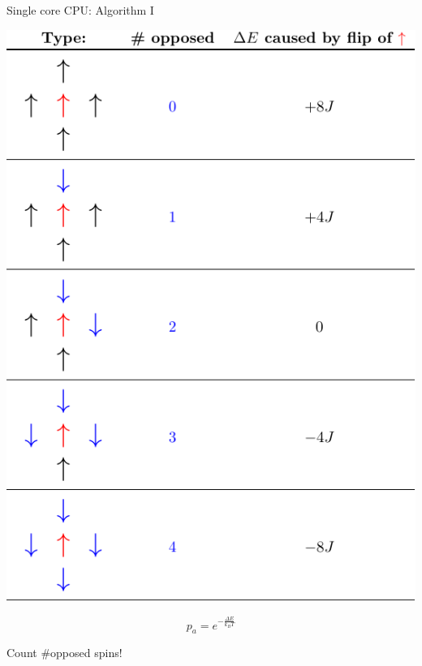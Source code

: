 \documentclass{beamer}
\begin{document}
\begin{frame}{Single core CPU: Algorithm I}
    \begin{minipage}{0.5\textwidth}
        \includegraphics[keepaspectratio=true, scale=0.6]{images/cases.pdf}\\
    \end{minipage} \pause
    \hfill
    \begin{minipage}{0.4\textwidth}
        \begin{equation*}
            p_a = e^{-\frac{\Delta E}{k_B T}}
        \end{equation*} \pause
        \begin{exampleblock}{}
            Count \#opposed spins!
        \end{exampleblock}
    \end{minipage}
\end{frame}
\end{document}
